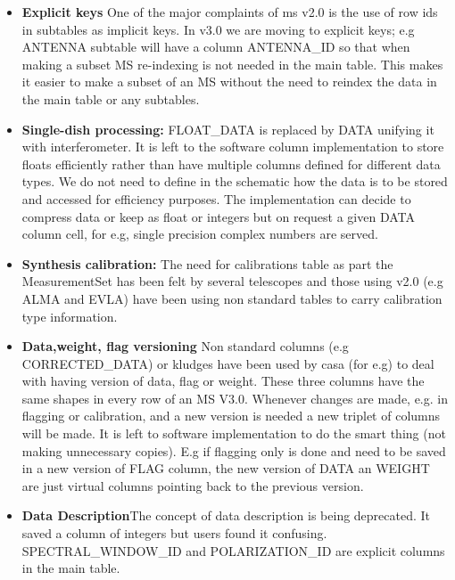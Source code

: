 \documentclass{article}
\begin{document}
\begin{itemize}

\item{{\bf Explicit keys} One of the major complaints of ms v2.0 is
  the use of row ids in subtables as implicit keys. In v3.0 we are
  moving to explicit keys; e.g ANTENNA subtable will have a column
  ANTENNA\_ID so that when making a subset MS re-indexing is not
  needed in the main table. This makes it easier to make a subset of
  an MS without the need to reindex the data in the main table or any
  subtables.}

\item{{\bf Single-dish processing:} FLOAT\_DATA is 
  replaced by DATA unifying it with interferometer. It is left to the
  software column implementation to store floats efficiently rather
  than have multiple columns defined for different data types. We
  do not need to define in the schematic how the data is to be stored
  and accessed for efficiency purposes. The implementation can decide
  to compress data or keep as float or integers but on request a given
  DATA column cell, for e.g, single precision complex numbers are
  served.}


\item{{\bf Synthesis calibration:} The need for calibrations table as
    part the MeasurementSet has been felt by several telescopes and
    those using v2.0 (e.g ALMA and EVLA) have been using non standard
    tables to carry calibration type information.}

\item{{\bf Data,weight, flag versioning} Non standard columns (e.g
    CORRECTED\_DATA) or kludges have been used by casa (for e.g) to
    deal with having version of data, flag or weight. These three columns
    have the same shapes in every row of an MS V3.0.  Whenever
    changes are made, e.g. in flagging or calibration, and a new version
    is needed a new triplet of columns will be made. It is left to
    software implementation to do the smart thing (not making
    unnecessary copies). E.g if flagging only is done and need to be
    saved in a new version of FLAG column, the new version of DATA an
    WEIGHT are just virtual columns pointing back to the
    previous version.}

\item{{\bf Data Description}The concept of data description is being
    deprecated. It saved a column of integers but users found it
    confusing. SPECTRAL\_WINDOW\_ID and POLARIZATION\_ID are explicit
    columns in the main table.}


\end{itemize}
\end{document}

